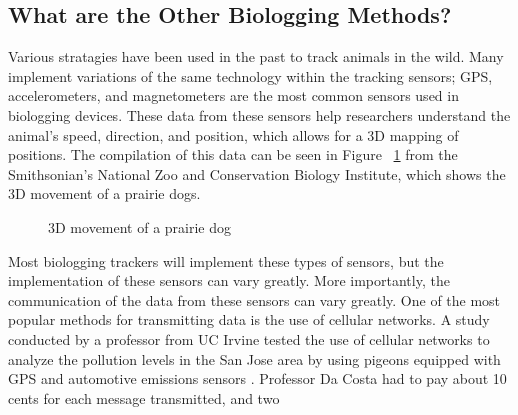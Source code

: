 \documentclass[sigplan,screen,nonacm]{acmart}
\begin{document}
\subsection{What are the Other Biologging Methods?}
\label{subsec:What are the Other Biologging Methods?}

Various stratagies have been used in the past to track animals in the wild. Many
implement variations of the same technology within the tracking sensors;
GPS, accelerometers, and magnetometers are the most common sensors used in
biologging devices. These data from these sensors help researchers understand
the animal's  speed, direction, and position, which allows for a 3D mapping of
positions\cite{Kidangoor_2024}. The compilation of this data can be seen in Figure ~\ref{fig:prairie_dog_3D_movement}
from the Smithsonian's National Zoo and Conservation Biology Institute, which
shows the 3D movement of a prairie dogs.
\begin{figure}[htbp]
  \centering
  \caption{3D movement of a prairie dog \cite{Kidangoor_2024}}
  \label{fig:prairie_dog_3D_movement}
\end{figure}
Most biologging trackers will implement these types of sensors, but the
implementation of these sensors can vary greatly. More importantly, the
communication of the data from these sensors can vary greatly. One of the
most popular methods for transmitting data is the use of cellular networks.
A study conducted by a professor from UC Irvine tested the use of cellular
networks to analyze the pollution levels in the San Jose area by using pigeons
equipped with GPS and automotive emissions sensors \cite{Martin_2006}. Professor
Da Costa had to pay about 10 cents for each message transmitted, and two
\end{document}
